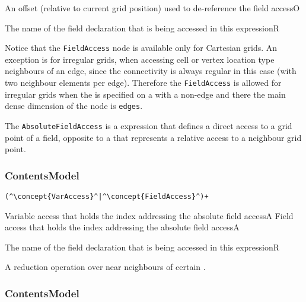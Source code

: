 \begin{HIRChildElements} 
	{An offset (relative to current grid position) used to de-reference the field access}{O}
\end{HIRChildElements}
\begin{HIRAttributes}
	{The name of the field declaration that is being accessed in this expression}{R}
\end{HIRAttributes}

Notice that the {\tt FieldAccess} node is available only for 
Cartesian grids. 
An exception is for irregular grids, when accessing cell or vertex
location type neighbours of an edge, since the connectivity is always
regular in this case (with two neighbour elements per edge). 
Therefore the {\tt FieldAccess} is allowed for irregular grids
when the  is specified on a  with 
a non-edge  and there the main 
dense dimension of the  node is {\tt edges}.

The {\tt AbsoluteFieldAccess} is a expression that defines a direct access to a grid point of a field, 
opposite to a  that
represents a relative access to a neighbour grid point.

\subsubsection*{ContentsModel}{}

\begin{lstlisting}[style=default,frame=none]
(^\concept{VarAccess}^|^\concept{FieldAccess}^)+
\end{lstlisting}

\begin{HIRChildElements} 
	{Variable access that holds the index addressing the absolute field access}{A}
	{Field access that holds the index addressing the absolute field access}{A}
\end{HIRChildElements}
\begin{HIRAttributes}
	{The name of the field declaration that is being accessed in this expression}{R}
\end{HIRAttributes}

A reduction operation over near neighbours of certain  .

\subsubsection*{ContentsModel}{}

